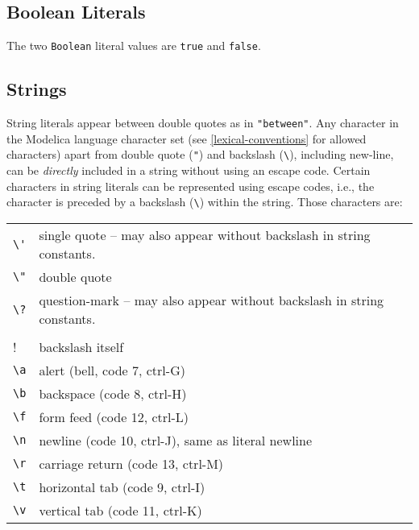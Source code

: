 \subsection{Boolean Literals}

The two \lstinline[basicstyle=\ttfamily]!Boolean! literal values are \lstinline[basicstyle=\ttfamily]!true! and \lstinline[basicstyle=\ttfamily]!false!.

\subsection{Strings}

String literals appear between double quotes as in \lstinline[basicstyle=\ttfamily]!"between"!. Any
character in the Modelica language character set (see \autoref{lexical-conventions} for
allowed characters) apart from double quote (\lstinline[basicstyle=\ttfamily]!"!) and backslash
(\lstinline[basicstyle=\ttfamily]!\!), including new-line, can be \emph{directly} included
in a string without using an escape code. Certain characters in string
literals can be represented using escape codes, i.e., the character is
preceded by a backslash (\lstinline[basicstyle=\ttfamily]!\!) within the string. Those
characters are:

\begin{longtable}[c]{@{}ll@{}}
\lstinline[basicstyle=\ttfamily]!\'! & single quote -- may also appear without backslash in string constants.\\ 
\lstinline[basicstyle=\ttfamily]!\"! & double quote\\ 
\lstinline[basicstyle=\ttfamily]!\?! & question-mark -- may also appear without backslash in string constants.\\
\lstinline[basicstyle=\ttfamily]!\\! & backslash itself\\ 
\lstinline[basicstyle=\ttfamily]!\a! & alert (bell, code 7, ctrl-G)\\ 
\lstinline[basicstyle=\ttfamily]!\b! & backspace (code 8, ctrl-H)\\ 
\lstinline[basicstyle=\ttfamily]!\f! & form feed (code 12, ctrl-L)\\ 
\lstinline[basicstyle=\ttfamily]!\n! & newline (code 10, ctrl-J), same as literal newline\\ 
\lstinline[basicstyle=\ttfamily]!\r! & carriage return (code 13, ctrl-M)\\ 
\lstinline[basicstyle=\ttfamily]!\t! & horizontal tab (code 9, ctrl-I)\\ 
\lstinline[basicstyle=\ttfamily]!\v! & vertical tab (code 11, ctrl-K)\\ 
\end{longtable}

